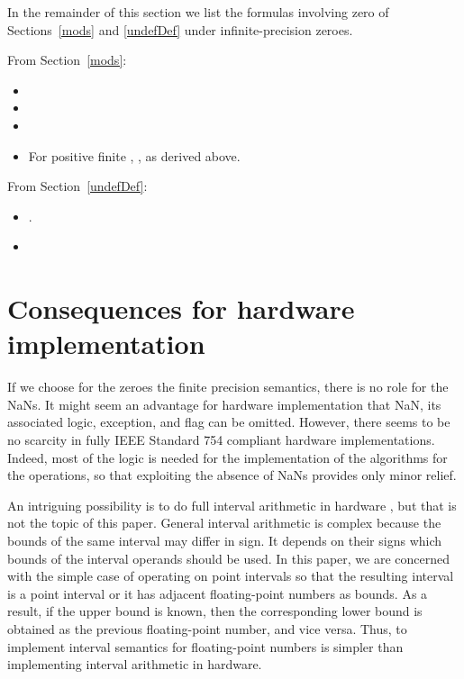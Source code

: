 \documentclass[11pt]{article}
\begin{document}
In the remainder of this section we list the formulas involving zero of
Sections~\ref{mods} and \ref{undefDef} under infinite-precision zeroes.

From Section~\ref{mods}:
\begin{itemize}
\item

\item

\item 
\item
For positive finite ,
, as derived above.
\end{itemize}

From Section~\ref{undefDef}:
 
\begin{itemize}
\item
.
\item

\end{itemize}


\section{Consequences for hardware implementation}
\label{hardwCons}

If we choose for the zeroes the finite precision semantics, there is
no role for the NaNs.  It might seem an advantage for hardware
implementation that NaN, its associated logic, exception, and flag can
be omitted. However, there seems to be no scarcity in fully IEEE
Standard 754 compliant hardware implementations. Indeed, most of the
logic is needed for the implementation of the algorithms for the
operations, so that exploiting the absence of NaNs provides only minor
relief.

An intriguing possibility is to do full interval arithmetic in
hardware \cite{iahpsun,hwsupia,vpia}, but that is not the topic of this paper.
General interval arithmetic is complex because the bounds of the same
interval may differ in sign.
It depends on their signs which bounds of the interval operands
should be used.  In this paper, we are concerned
with the simple case of operating on point intervals so that the
resulting interval is a point interval or it has adjacent floating-point
numbers as bounds.  As a result, if the upper bound is known, then the
corresponding lower bound is obtained as the previous floating-point
number, and vice versa. Thus, to implement interval semantics for
floating-point numbers is simpler than implementing interval
arithmetic in hardware.
\end{document}
